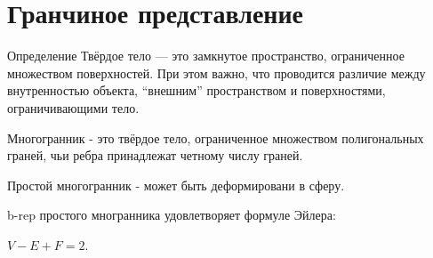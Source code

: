\documentclass[10pt]{beamer}
\begin{document}
\section[B-Rep]{Гранчиное представление }

\begin{frame}

	
	\begin{block}{Определение}
		Твёрдое тело --- это замкнутое пространство, ограниченное множеством поверхностей. При этом важно, что проводится различие между внутренностью объекта, “внешним” пространством и поверхностями, ограничивающими тело. 
	\end{block}
	
	\begin{center}
	\end{center}
	
\end{frame}


\begin{frame}\COVER{\frametitle{}}
	
	{
	}{
		Многогранник - это твёрдое тело, ограниченное множеством полигональных граней, чьи ребра принадлежат четному числу граней. 
		
		Простой многогранник -   может быть деформировани в сферу. 
		
		b-rep простого многранника удовлетворяет формуле Эйлера:
		
		$V - E + F = 2$.
		
	}
	
	
\end{frame}

\begin{frame}\COVER{\frametitle{}}
	
	
\end{frame}
\end{document}

